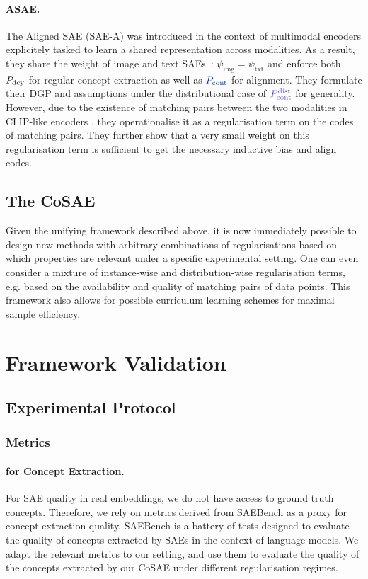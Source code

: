 \documentclass{article}
\begin{document}
\paragraph{ASAE.} The Aligned SAE (SAE-A) \citep{TODO:dhimoila} was introduced in the context of multimodal encoders explicitely tasked to learn a shared representation across modalities. As a result, they share the weight of image and text SAEs~: $\psi_{\mathrm{img}} = \psi_{\mathrm{txt}}$ and enforce both $P_{\mathrm{dcy}}$ for regular concept extraction as well as $\Pcont$ for alignment. They formulate their DGP and assumptions under the distributional case of $\Pcontdist$ for generality. However, due to the existence of matching pairs between the two modalities in CLIP-like encoders \citep{TODO:CLIP}, they operationalise it as a regularisation term on the codes of matching pairs. They further show that a very small weight on this regularisation term is sufficient to get the necessary inductive bias and align codes.

\subsection{The CoSAE}

Given the unifying framework described above, it is now immediately possible to design new methods with arbitrary combinations of regularisations based on which properties are relevant under a specific experimental setting. One can even consider a mixture of instance-wise and distribution-wise regularisation terms, e.g. based on the availability and quality of matching pairs of data points. This framework also allows for possible curriculum learning schemes for maximal sample efficiency.

\section{Framework Validation}

\subsection{Experimental Protocol}

\subsubsection{Metrics}

\paragraph{\InterVench for Concept Extraction.} For SAE quality in real embeddings, we do not have access to ground truth concepts. Therefore, we rely on metrics derived from SAEBench \citep{TODO} as a proxy for concept extraction quality. SAEBench is a battery of tests designed to evaluate the quality of concepts extracted by SAEs in the context of language models. We adapt the relevant metrics to our setting, and use them to evaluate the quality of the concepts extracted by our CoSAE under different regularisation regimes.
\end{document}
